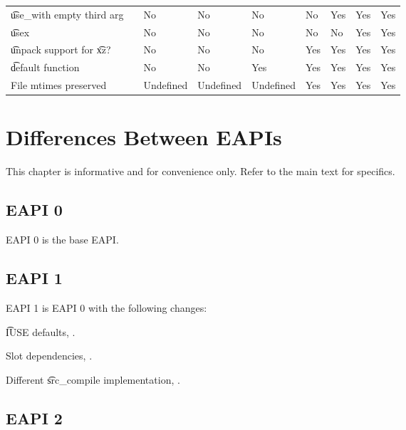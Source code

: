 \begin{landscape}
\begin{longtable}{llP{5em}P{5em}P{6em}P{6em}P{6em}P{6em}P{6em}}
\t{use\_with} empty third arg &  &
    No & No & No & No & Yes & Yes & Yes \\

\t{usex} &  &
    No & No & No & No & No & Yes & Yes \\

\t{unpack} support for \t{xz}? &  &
    No & No & No & Yes & Yes & Yes & Yes \\

\t{default} function &  &
    No & No & Yes & Yes & Yes & Yes & Yes \\

File mtimes preserved &  &
    Undefined & Undefined & Undefined & Yes & Yes & Yes & Yes \\

\end{longtable}
\end{landscape}

\chapter{Differences Between EAPIs}

\note This chapter is informative and for convenience only. Refer to the main text for specifics.

\section*{EAPI 0}

EAPI 0 is the base EAPI.

\section*{EAPI 1}

EAPI 1 is EAPI 0 with the following changes:

\begin{compactitem}
\item \t{IUSE} defaults, .
\item Slot dependencies, .
\item Different \t{src\_compile} implementation, .
\end{compactitem}

\section*{EAPI 2}

